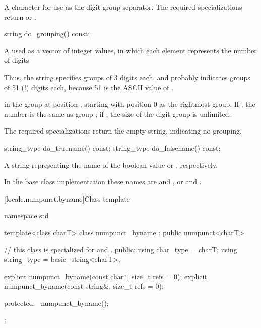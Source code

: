 \begin{itemdescr}
\pnum
\returns
A character for use as the digit group separator.
The required specializations return  or .
\end{itemdescr}

%
\begin{itemdecl}
string do_grouping() const;
\end{itemdecl}

\begin{itemdescr}
\pnum
\returns
A   used as a vector of integer values,
in which each element  represents the number of digits
\begin{footnote}
Thus,
the string  specifies groups of 3 digits each, and
 probably indicates groups of 51 (!) digits each,
because 51 is the ASCII value of .
\end{footnote}
in the group at position ,
starting with position 0 as the rightmost group.
If ,
the number is the same as group ;
if ,
the size of the digit group is unlimited.

\pnum
The required specializations return the empty string, indicating no grouping.
\end{itemdescr}

%
%
\begin{itemdecl}
string_type do_truename()  const;
string_type do_falsename() const;
\end{itemdecl}

\begin{itemdescr}
\pnum
\returns
A string representing the name of
the boolean value  or , respectively.

\pnum
In the base class implementation
these names are  and ,
or  and .
\end{itemdescr}

[locale.numpunct.byname]{Class template }

%
\begin{codeblock}
namespace std {
  template<class charT>
    class numpunct_byname : public numpunct<charT> {
    // this class is specialized for  and .
    public:
      using char_type   = charT;
      using string_type = basic_string<charT>;

      explicit numpunct_byname(const char*, size_t refs = 0);
      explicit numpunct_byname(const string&, size_t refs = 0);

    protected:
      ~numpunct_byname();
    };
}
\end{codeblock}

